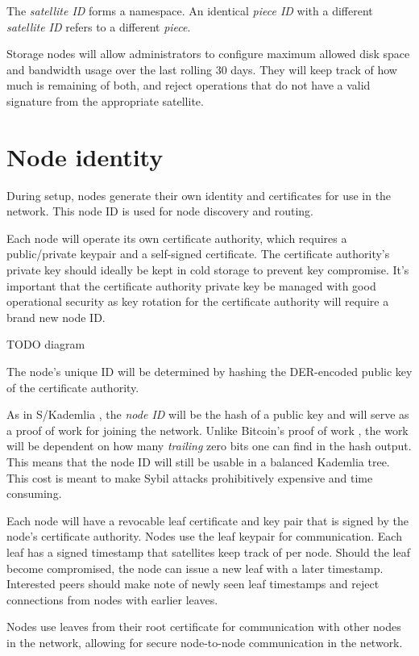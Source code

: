 \documentclass[11pt,fleqn,openany]{book}
\newcommand{\todo}[1]{{\color{red} TODO #1 }}
\begin{document}
The {\em satellite ID} forms a namespace. An identical {\em piece ID} with a
different {\em satellite ID} refers to a different {\em piece}.

Storage nodes will allow administrators to configure maximum allowed disk
space and bandwidth usage over the last rolling 30 days.
They will keep track of how much is remaining of both, and reject operations
that do not have a valid signature from the appropriate satellite.

\section{Node identity}

During setup, nodes generate their own identity and certificates for use in
the network.
This node ID is used for node discovery and routing.

Each node will operate its own certificate authority, which requires a
public/private keypair and a self-signed certificate. The certificate
authority's private key should ideally be kept in cold storage to prevent key
compromise.
It's important that the certificate authority private key be managed with good
operational security as key rotation for the certificate authority will require
a brand new node ID.

\todo{diagram}

The node's unique ID will be determined by hashing the DER-encoded public key
of the certificate authority.

As in S/Kademlia \cite{skad}, the {\em node ID} will be the hash of a public key
and will serve as a proof of work for joining the network. Unlike Bitcoin's
proof of work \cite{bitcoin}, the work will be dependent on how many
{\em trailing}
zero bits one can find in the hash output. This means that the node ID will
still be usable in a balanced Kademlia \cite{kad} tree.
This cost is meant to make Sybil attacks prohibitively expensive and time
consuming.

Each node will have a revocable leaf certificate and key pair that is signed by
the node's certificate authority. Nodes use the leaf keypair for
communication. Each leaf has a signed timestamp that satellites
keep track of per node. Should the leaf become compromised, the node can issue
a new leaf with a later timestamp. Interested peers should make note of newly
seen leaf timestamps and reject connections from nodes with earlier leaves.

Nodes use leaves from their root certificate for communication with other
nodes in the network, allowing for secure node-to-node communication in the network.
\end{document}
